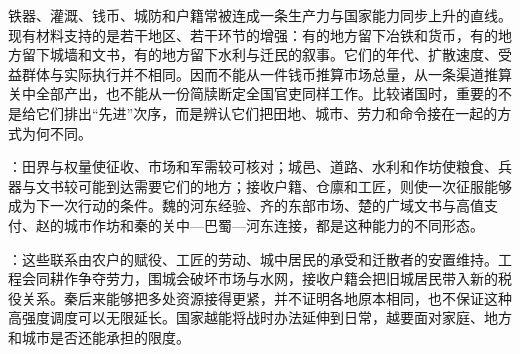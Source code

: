 \begin{debate}
铁器、灌溉、钱币、城防和户籍常被连成一条生产力与国家能力同步上升的直线。现有材料支持的是若干地区、若干环节的增强：有的地方留下冶铁和货币，有的地方留下城墙和文书，有的地方留下水利与迁民的叙事。它们的年代、扩散速度、受益群体与实际执行并不相同。因而不能从一件钱币推算市场总量，从一条渠道推算关中全部产出，也不能从一份简牍断定全国官吏同样工作。比较诸国时，重要的不是给它们排出“先进”次序，而是辨认它们把田地、城市、劳力和命令接在一起的方式为何不同。
\end{debate}

\begin{turningpoint}
：田界与权量使征收、市场和军需较可核对；城邑、道路、水利和作坊使粮食、兵器与文书较可能到达需要它们的地方；接收户籍、仓廪和工匠，则使一次征服能够成为下一次行动的条件。魏的河东经验、齐的东部市场、楚的广域文书与高值支付、赵的城市作坊和秦的关中—巴蜀—河东连接，都是这种能力的不同形态。

：这些联系由农户的赋役、工匠的劳动、城中居民的承受和迁散者的安置维持。工程会同耕作争夺劳力，围城会破坏市场与水网，接收户籍会把旧城居民带入新的税役关系。秦后来能够把多处资源接得更紧，并不证明各地原本相同，也不保证这种高强度调度可以无限延长。国家越能将战时办法延伸到日常，越要面对家庭、地方和城市是否还能承担的限度。
\end{turningpoint}

